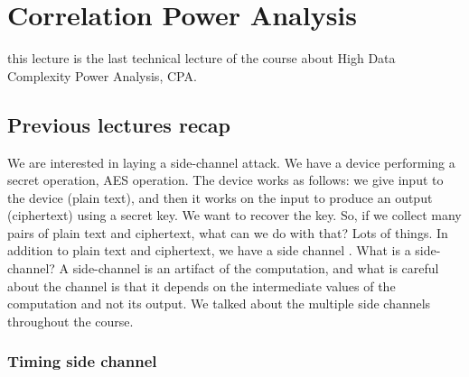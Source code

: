 \chapter{Correlation Power Analysis} \label{c8_fifthcapter}

this lecture is the last technical lecture of the course about High Data
Complexity Power Analysis, CPA.

\section{Previous lectures recap}\label{c8_prev_lectures_recap:sec}

We are interested in laying a side-channel attack. We have a device performing
a secret operation, AES operation. The device works as follows: we give input to
the device (plain text), and then it works on the input to produce an output
(ciphertext) using a secret key. We want to recover the key. So, if we collect
many pairs of plain text and ciphertext, what can we do with that? Lots of
things. In addition to plain text and ciphertext, we have a side channel \cite{SideChannel}. What
is a side-channel? A side-channel is an artifact of the computation, and what is
careful about the channel is that it depends on the intermediate values of the
computation and not its output. We talked about the multiple side channels
throughout the course.

\subsection{Timing side channel}\label{c8_prev_lectures_recap_timing_sc:subsec}

